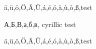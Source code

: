 \documentclass{article}
\begin{document}
ä,ü,ö,Ö,Ä,Ü,á,é,ó,à,ù,ò,ß,test

А,Б,В,а,б,в, cyrillic test

{\selectfont
ä,ü,ö,Ö,Ä,Ü,á,é,ó,à,ù,ò,ß,test}
\end{document}
